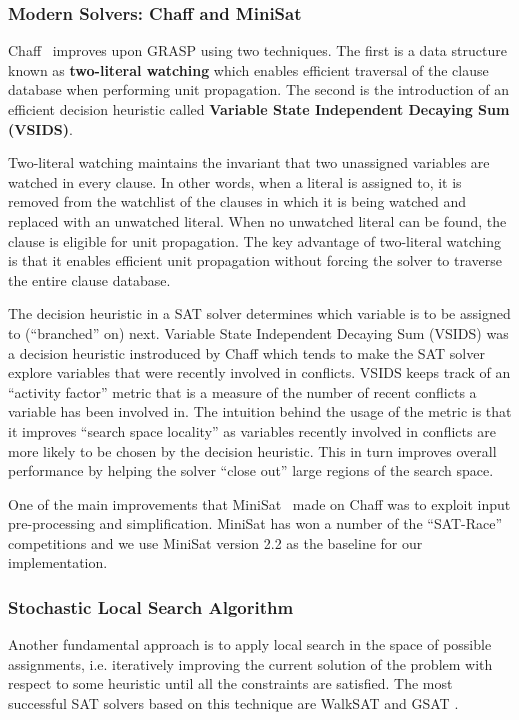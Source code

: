 \documentclass[letterpaper, compsoc, conference]{IEEEtran}
\begin{document}
\subsubsection{Modern Solvers: Chaff and MiniSat}

Chaff~\cite{Moskewicz2001Chaff} improves upon GRASP using two techniques.  The
first is a data structure known as \textbf{two-literal watching} which enables
efficient traversal of the clause database when performing unit propagation.
The second is the introduction of an efficient decision heuristic called
\textbf{Variable State Independent Decaying Sum (VSIDS)}.

Two-literal watching maintains the invariant that two unassigned variables are
watched in every clause. In other words, when a literal is assigned to, it is
removed from the watchlist of the clauses in which it is being watched and
replaced with an unwatched literal. When no unwatched literal can be found, the
clause is eligible for unit propagation. The key advantage of two-literal
watching is that it enables efficient unit propagation without forcing the
solver to traverse the entire clause database.

The decision heuristic in a SAT solver determines which variable is to be
assigned to (``branched'' on) next.  Variable State Independent Decaying Sum
(VSIDS) was a decision heuristic instroduced by Chaff which tends to make the
SAT solver explore variables that were recently involved in conflicts. VSIDS
keeps track of an ``activity factor'' metric that is a measure of the number of
recent conflicts a variable has been involved in.  The intuition behind the
usage of the metric is that it improves ``search space locality'' as variables
recently involved in conflicts are more likely to be chosen by the decision
heuristic.  This in turn improves overall performance by helping the solver
``close out'' large regions of the search space.

One of the main improvements that MiniSat~\cite{MiniSat} made on Chaff was to
exploit input pre-processing and simplification. MiniSat has won a number of
the ``SAT-Race'' competitions and we use MiniSat version 2.2 as the baseline
for our implementation.

\subsubsection{Stochastic Local Search Algorithm}
Another fundamental approach is to apply local search in the space of possible
assignments, i.e. iteratively improving the current solution of the
problem with respect to some heuristic until all the constraints are satisfied.
The most successful SAT solvers based on this technique are WalkSAT
\cite{Selman95localsearch} and GSAT \cite{Selman1992}.
\end{document}
